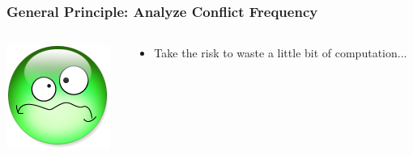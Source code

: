 \documentclass[xcolor={x11names,svgnames},x11names,svgnames]{beamer}
\begin{document}
\begin{frame}[label=idea1]
  \frametitle{General Principle: \textbf{Analyze Conflict Frequency}}

  \begin{columns}[c]
    \begin{column}{.1\textwidth}
      \vspace{1mm}
      \includegraphics[width=\textwidth]{triste.png}
    \end{column}
    
    \begin{column}{.9\textwidth}
      \begin{itemize}
      \item Take the risk to waste a little bit of computation...
      \end{itemize}
    \end{column}
  \end{columns}

  \vspace{1cm}
  

\end{frame}
\end{document}
